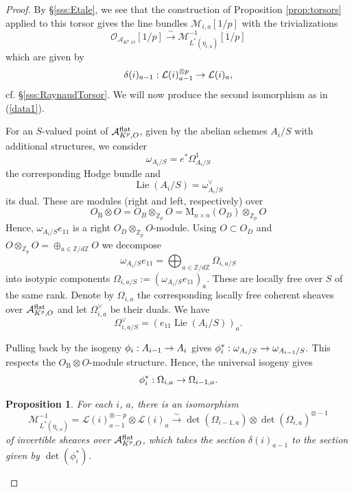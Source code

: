 \documentclass[reqno, 10pt]{amsart}
\makeatletter
\newcommand{\BZ}{\ensuremath{\mathbb {Z}}\xspace}
\newcommand{\CA}{\ensuremath{\mathcal {A}}\xspace}
\newcommand{\CL}{\ensuremath{\mathcal {L}}\xspace}
\newcommand{\CM}{\ensuremath{\mathcal {M}}\xspace}
\newcommand{\CO}{\ensuremath{\mathcal {O}}\xspace}
\newcommand{\RB}{\ensuremath{\mathrm {B}}\xspace}
\newcommand{\RM}{\ensuremath{\mathrm {M}}\xspace}
\DeclareMathOperator{\Lie}{Lie}
\newtheorem{proposition}[subsubsection]{Proposition}
\theoremstyle{definition}
\numberwithin{equation}{subsection}
\numberwithin{subsubsection}{subsection}
\renewcommand{\to}{%
   \ifbool{@display}{\longrightarrow}{\rightarrow}%
   }
\makeatother
\begin{document}
\begin{proof}
By \S \ref{sss:Etale}, we see that the construction of Proposition \ref{prop:torsors} applied to this torsor gives the line bundles 
$\CM_{i,a}[1/p]$ with the trivializations
 \[
 \CO_{\CA_{K^p, O}}[1/p]\xrightarrow{\sim}  \CM^{-1}_{L^*(\eta_{i, a})}[1/p]
  \]
 which are given by  
 \[
 \delta(i)_{a-1}:  \CL(i)_{a-1}^{\otimes p}\to  \CL(i)_{a} ,
 \]
cf.  \S\ref{sss:RaynaudTorsor}. We will now produce the second isomorphism as in (\ref{data1}).


For an $S$-valued point of $\CA^{\rm flat}_{K^p, O}$, given by the abelian schemes $A_i/S$ with additional structures, we consider 
\[
\omega_{A_i/S}=e^*\Omega^1_{A_i/S}
\]
the corresponding Hodge bundle and 
\[
\Lie(A_i/S)=\omega_{A_i/S}^\vee
\]
its dual. These are modules (right and left, respectively) over 
\[
O_\RB\otimes O=O_B\otimes_{\BZ_p}O=\RM_{n\times n}(O_D)\otimes_{\BZ_p}O
\]
Hence, $\omega_{A_i/S}e_{11}$ is a right $O_D\otimes_{\BZ_p}O$-module.
Using $O\subset O_D$ and $O\otimes_{\BZ_p}O=\oplus_{a\in \BZ/d\BZ} O$ we decompose
\[
\omega_{A_i/S}e_{11}=\bigoplus_{a\in \BZ/d\BZ} \Omega_{i,a/S} 
\]
into isotypic components $\Omega_{i,a/S}:= (\omega_{A_i/S}e_{11})_a$. These are locally free 
over $S$ of the same rank. Denote by $\Omega_{i,a} $ the corresponding locally free coherent sheaves 
over $\CA^{\rm flat}_{K^p, O}$ and let $\Omega^\vee_{i,a} $ be their duals. We have
\[
\Omega^\vee_{i,a/S} =(e_{11}\Lie(A_i/S))_a.
\]

Pulling back by the isogeny $\phi_i: A_{i-1}\to A_i$ gives  
$
\phi^*_i: \omega_{A_{i}/S}\to \omega_{A_{i-1}/S}.
$
This respects the $O_\RB\otimes O$-module structure. Hence, the universal isogeny gives
\[
\phi^*_i: \Omega_{i,a} \to \Omega_{i-1,a}.
\]
 
 \begin{proposition}\label{prop:Fitting}
For each  $i$, $a$, there is an  isomorphism  
 \begin{equation*}\label{Fitt}
 \CM^{-1}_{L^*(\eta_{i,a})} =\CL(i)_{a-1}^{\otimes -p}\otimes \CL(i)_{a}\xrightarrow{\sim} \det(\Omega_{i-1,a})\otimes \det(\Omega_{i,a} )^{\otimes -1} 
  \end{equation*}
 of invertible sheaves over $\CA^{\rm flat}_{K^p, O}$, which takes the section $\delta(i)_{a-1}$ to the section given by $\det(\phi^*_i)$. 
\end{proposition}


\end{proof}
\end{document}
